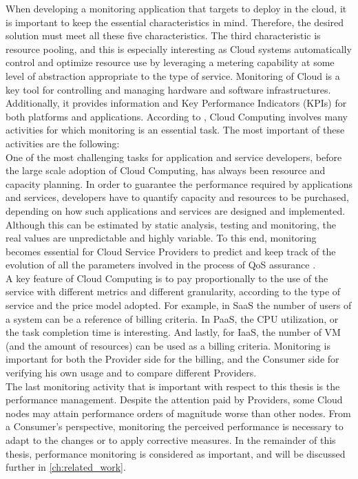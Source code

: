 \noindent
When developing a monitoring application that targets to deploy in the cloud, it is important to keep the essential characteristics in mind. Therefore, the desired solution must meet all these five characteristics. The third characteristic is resource pooling, and this is especially interesting as Cloud systems automatically control and optimize resource use by leveraging a metering capability at some level of abstraction appropriate to the type of service. Monitoring of Cloud is a key tool for controlling and managing hardware and software infrastructures. Additionally, it provides information and Key Performance Indicators (KPIs) for both platforms and applications. According to \cite{aceto2013cloud}, Cloud Computing involves many activities for which monitoring is an essential task. The most important of these activities are the following:\\

\noindent
One of the most challenging tasks for application and service developers, before the large scale adoption of Cloud Computing, has always been resource and capacity planning. 
In order to guarantee the performance required by applications and services, developers have to quantify capacity and resources to be purchased, depending on how such applications and services are designed and implemented.
Although this can be estimated by static analysis, testing and monitoring, the real values are unpredictable and highly variable. To this end, monitoring becomes essential for Cloud Service Providers to predict and keep track of the evolution of all the parameters involved in the process of QoS assurance \cite{katsaros2011building}.\\

\noindent
A key feature of Cloud Computing is to pay proportionally to the use of the service with different metrics and different granularity, according to the type of service and the price model adopted. For example, in SaaS the number of users of a system can be a reference of billing criteria. In PaaS, the CPU utilization, or the task completion time is interesting. And lastly, for IaaS, the number of VM (and the amount of resources) can be used as a billing criteria. Monitoring is important for both the Provider side for the billing, and the Consumer side for verifying his own usage and to compare different Providers.\\

\noindent
The last monitoring activity that is important with respect to this thesis is the performance management. Despite the attention paid by Providers, some Cloud nodes may attain performance orders of magnitude worse than other nodes. From a Consumer's perspective, monitoring the perceived performance is necessary to adapt to the changes or to apply corrective measures. In the remainder of this thesis, performance monitoring is considered as important, and will be discussed further in \autoref{ch:related_work}.\\

